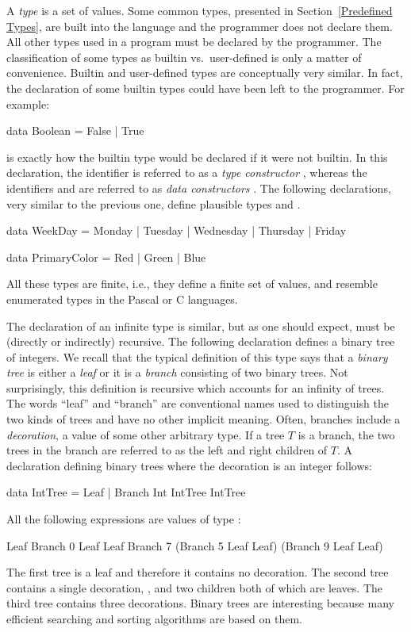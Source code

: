 A \emph{type} is a set of values.
Some common types, presented in Section~\ref{Predefined Types},
are built into the language
and the programmer does not declare them.
All other types used in a program must be declared by the programmer.
The classification of some types as builtin vs.~user-defined 
is only a matter of convenience.
Builtin and user-defined types are conceptually very similar.
In fact,
the declaration of some builtin types could have been left to the programmer.
For example:
%
\begin{curry}
data Boolean = False | True
\end{curry}
%
is exactly how the builtin  type would be declared
if it were not builtin.
In this declaration, the identifier 
is referred to as a \emph{type constructor}%
,
whereas the identifiers  and 
are referred to as \emph{data constructors}%
.
The following declarations, very similar to the previous one,
define plausible types  and .
%
\begin{curry}
data WeekDay = Monday | Tuesday | Wednesday | Thursday | Friday

data PrimaryColor = Red | Green | Blue
\end{curry}
%
All these types are finite, i.e., they define a finite set of values,
and resemble enumerated types in the Pascal or C languages.

The declaration of an infinite type is similar, but as one should expect,
must be (directly or indirectly) recursive.
The following declaration defines a binary tree of integers.
We recall that the typical definition
of this type says that a \emph{binary tree}
is either a \emph{leaf} or it is a \emph{branch} consisting of
two binary trees.
Not surprisingly, this definition is recursive which accounts
for an infinity of trees.
The words ``leaf'' and ``branch'' are conventional names used
to distinguish the two kinds of trees and have no other implicit meaning.
Often, branches include a \emph{decoration}, a value of
some other arbitrary type.
If a tree $T$ is a branch, the two trees in the branch
are referred to as the left and right children of $T$.
A declaration defining binary trees where the decoration
is an integer follows:
%
\begin{curry}
data IntTree = Leaf | Branch Int IntTree IntTree
\end{curry}
%
All the following expressions are values of type :
%
\begin{curry}
Leaf
Branch 0 Leaf Leaf
Branch 7 (Branch 5 Leaf Leaf) (Branch 9 Leaf Leaf)
\end{curry}
%
The first tree is a leaf and therefore it contains no decoration.
The second tree contains a single decoration, ,
and two children both of which are leaves.
The third tree contains three decorations.
Binary trees are interesting because many efficient searching
and sorting algorithms are based on them.

